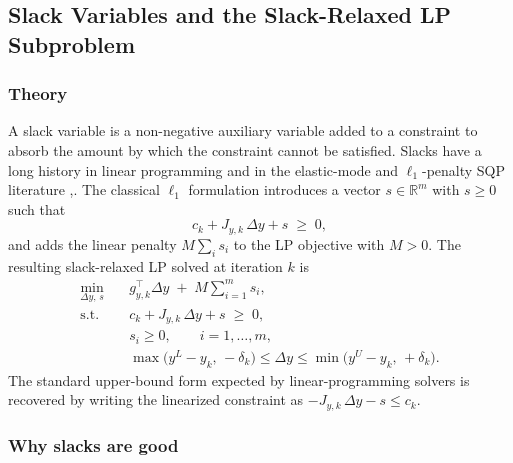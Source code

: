 \subsection{Slack Variables and the Slack-Relaxed LP Subproblem}
\label{sec:slacks}

\subsubsection*{Theory}

A slack variable is a non-negative auxiliary variable added to a constraint
to absorb the amount by which the constraint cannot be satisfied. Slacks
have a long history in linear programming and in the elastic-mode and
$\ell_1$-penalty SQP literature
\citep[Ch.~17--18]{NocedalWright2006},\citep{Fletcher1987}. The classical
$\ell_1$ formulation introduces a vector $s \in \mathbb{R}^m$ with
$s \geq 0$ such that
\begin{equation}
    c_k + J_{y,k}\,\Delta y + s \;\geq\; 0,
\end{equation}
and adds the linear penalty $M \sum_i s_i$ to the LP objective with
$M > 0$. The resulting slack-relaxed LP solved at iteration $k$ is
\begin{align}
    \min_{\Delta y,\, s} \quad
        & g_{y,k}^{\!\top} \Delta y \;+\; M \sum_{i=1}^{m} s_i, \\
    \text{s.t.}\quad
        & c_k + J_{y,k}\,\Delta y + s \;\geq\; 0, \\
        & s_i \geq 0, \qquad i = 1, \dots, m, \\
        & \max\!\bigl(y^L - y_k,\, -\delta_k\bigr) \leq \Delta y \leq
          \min\!\bigl(y^U - y_k,\, +\delta_k\bigr).
\end{align}
The standard upper-bound form expected by linear-programming solvers is
recovered by writing the linearized constraint as
$-J_{y,k}\,\Delta y - s \leq c_k$.

\subsubsection*{Why slacks are good}

